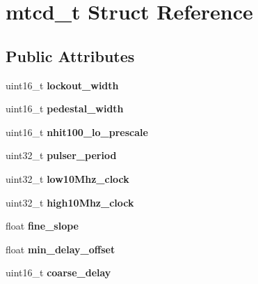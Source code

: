 \hypertarget{structmtcd__t}{
\section{mtcd\_\-t Struct Reference}
\label{structmtcd__t}
}
\subsection*{Public Attributes}
\begin{DoxyCompactItemize}
\item 
\hypertarget{structmtcd__t_a9b0b06b5b71e78dbe0e5f48ef86ec092}{
uint16\_\-t {\bfseries lockout\_\-width}}
\label{structmtcd__t_a9b0b06b5b71e78dbe0e5f48ef86ec092}

\item 
\hypertarget{structmtcd__t_a2ea4e91f2cc0aac21e500cd72ffe2afd}{
uint16\_\-t {\bfseries pedestal\_\-width}}
\label{structmtcd__t_a2ea4e91f2cc0aac21e500cd72ffe2afd}

\item 
\hypertarget{structmtcd__t_af61b82043c4fa022a02f7919dc3757f0}{
uint16\_\-t {\bfseries nhit100\_\-lo\_\-prescale}}
\label{structmtcd__t_af61b82043c4fa022a02f7919dc3757f0}

\item 
\hypertarget{structmtcd__t_aba1a1f2f9e77752ad23e605df25a07a2}{
uint32\_\-t {\bfseries pulser\_\-period}}
\label{structmtcd__t_aba1a1f2f9e77752ad23e605df25a07a2}

\item 
\hypertarget{structmtcd__t_a7eef8c8056249030106a1af4ad3b389a}{
uint32\_\-t {\bfseries low10Mhz\_\-clock}}
\label{structmtcd__t_a7eef8c8056249030106a1af4ad3b389a}

\item 
\hypertarget{structmtcd__t_a09cccb7bd815ad983552cb748964c796}{
uint32\_\-t {\bfseries high10Mhz\_\-clock}}
\label{structmtcd__t_a09cccb7bd815ad983552cb748964c796}

\item 
\hypertarget{structmtcd__t_aef0cb8925d228625c811831e9a45e63d}{
float {\bfseries fine\_\-slope}}
\label{structmtcd__t_aef0cb8925d228625c811831e9a45e63d}

\item 
\hypertarget{structmtcd__t_a23ec9b20b4b025d3755e0e426a0b9433}{
float {\bfseries min\_\-delay\_\-offset}}
\label{structmtcd__t_a23ec9b20b4b025d3755e0e426a0b9433}

\item 
\hypertarget{structmtcd__t_a65fbcf595b8ccade7ebed627a7d55bcd}{
uint16\_\-t {\bfseries coarse\_\-delay}}
\label{structmtcd__t_a65fbcf595b8ccade7ebed627a7d55bcd}


\end{DoxyCompactItemize}
